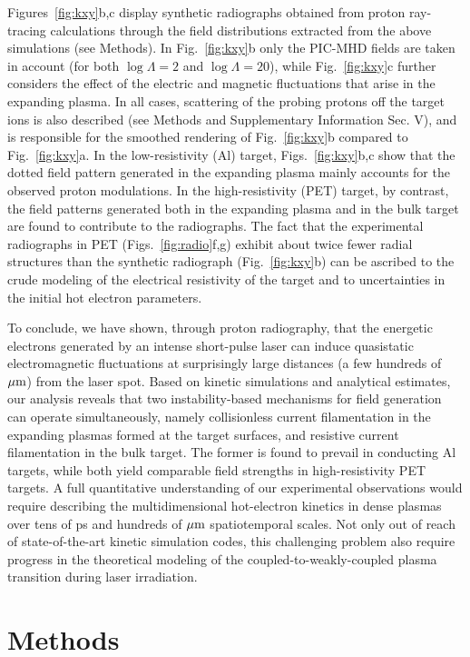 \documentclass[aps,twocolumn,showpacs,superscriptaddress]{revtex4}
\begin{document}
Figures~\ref{fig:kxy}b,c display synthetic radiographs obtained from proton ray-tracing calculations through the field distributions extracted from the above simulations (see Methods). In Fig.~\ref{fig:kxy}b only the PIC-MHD fields are taken in account (for both $\log \Lambda =2$ and $\log \Lambda = 20$), while Fig.~\ref{fig:kxy}c further considers the effect of the electric and magnetic fluctuations that arise in the expanding plasma. In all cases, scattering of the probing protons off the target ions is also described (see Methods and Supplementary Information Sec. V), and is responsible for the smoothed rendering of Fig.~\ref{fig:kxy}b compared to Fig.~\ref{fig:kxy}a. In the low-resistivity (Al) target,  Figs.~\ref{fig:kxy}b,c show that the dotted field pattern generated in the expanding plasma mainly accounts for the observed proton modulations. In the high-resistivity (PET) target, by contrast, the field patterns generated both in the expanding plasma and in the bulk target are found to contribute to the radiographs. The fact that
the experimental radiographs in PET (Figs.~\ref{fig:radio}f,g) exhibit about twice fewer radial structures than the synthetic radiograph (Fig.~\ref{fig:kxy}b) can be ascribed to the crude modeling of the electrical resistivity of the target and to uncertainties in the initial hot electron parameters.

To conclude, we have shown, through proton radiography, that the energetic electrons generated by an intense short-pulse laser can induce quasistatic electromagnetic fluctuations at surprisingly large distances (a few hundreds of $\rm \mu m$) from the laser spot. Based on kinetic simulations and analytical estimates, our analysis reveals that two instability-based mechanisms for field generation can operate simultaneously, namely collisionless current filamentation in the expanding plasmas formed at the target surfaces, and resistive current filamentation in the bulk target. The former is found to prevail in conducting Al targets, while both yield comparable field strengths in high-resistivity PET targets. A full quantitative understanding of our experimental observations would require describing the multidimensional hot-electron kinetics in dense plasmas over tens of ps and hundreds of $\rm \mu m$ spatiotemporal scales. Not only out of reach of state-of-the-art kinetic simulation codes, this challenging problem also require progress in the theoretical modeling of the coupled-to-weakly-coupled plasma transition during laser irradiation.

\section*{Methods}
\end{document}
